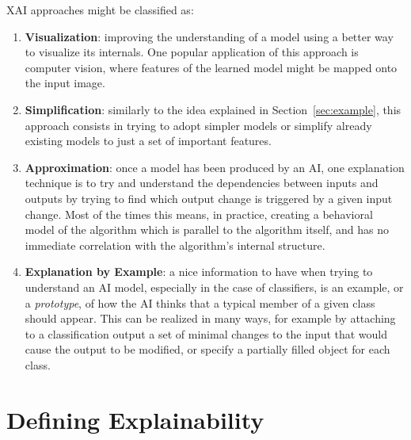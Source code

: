 \documentclass[conference]{IEEEtran}
\newcommand{\cit}[1][]{\todo[tickmarkheight=0.2cm]{cit #1}}
\begin{document}
XAI approaches might be classified as:

\begin{enumerate}
    \item \textbf{Visualization}: improving the understanding of a model using a
          better way to visualize its internals. One popular application of this
          approach is computer vision, where features of the learned model might
          be mapped onto the input image. \cit
    \item \textbf{Simplification}: similarly to the idea explained in
          Section~\ref{sec:example}, this approach consists in trying to adopt
          simpler models or simplify already existing models to just a set of
          important features. \cit
    \item \textbf{Approximation}: once a model has been produced by an AI, one
          explanation technique is to try and understand the dependencies
          between inputs and outputs by trying to find which output change is
          triggered by a given input change. Most of the times this means, in
          practice, creating a behavioral model of the algorithm which is
          parallel to the algorithm itself, and has no immediate correlation
          with the algorithm's internal structure.
    \item \textbf{Explanation by Example}: a nice information to have when
          trying to understand an AI model, especially in the case of
          classifiers, is an example, or a \textit{prototype}, of how the AI
          thinks that a typical member of a given class should appear. This can
          be realized in many ways, for example by attaching to a classification
          output a set of minimal changes to the input that would cause the
          output to be modified, or specify a partially filled object for each
          class.
\end{enumerate}





\section{Defining Explainability}
\label{sec:explainability}
\end{document}

